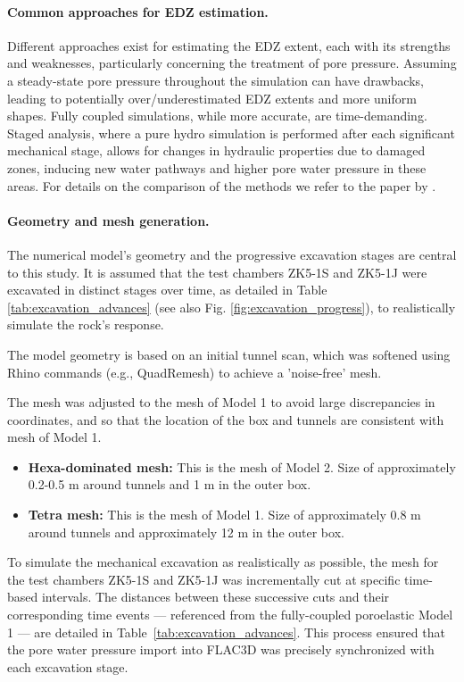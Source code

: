 \paragraph{Common approaches for EDZ estimation.}
Different approaches exist for estimating the \gls{EDZ} extent, each with its strengths and weaknesses, particularly concerning the treatment of pore pressure. Assuming a steady-state pore pressure throughout the simulation can have drawbacks, leading to potentially over/underestimated \gls{EDZ} extents and more uniform shapes. Fully coupled simulations, while more accurate, are time-demanding. Staged analysis, where a pure hydro simulation is performed after each significant mechanical stage, allows for changes in hydraulic properties due to damaged zones, inducing new water pathways and higher pore water pressure in these areas.
For details on the comparison of the methods we refer to the paper by \cite{Marschall2017}.

\paragraph{Geometry and mesh generation.}
The numerical model's geometry and the progressive excavation stages are central to this study.
It is assumed that the test chambers ZK5-1S and ZK5-1J were excavated in distinct stages over time, as detailed in Table \ref{tab:excavation_advances} (see also Fig. \ref{fig:excavation_progress}), to realistically simulate the rock's response.

The model geometry is based on an initial tunnel scan, which was softened using Rhino commands (e.g., QuadRemesh) to achieve a 'noise-free' mesh. 
\par The mesh was adjusted to the mesh of Model 1 to avoid large discrepancies in coordinates, and so that the location of the box and tunnels are consistent with mesh of Model 1.
\begin{itemize}%
    \item \textbf{Hexa-dominated mesh:} This is the mesh of Model 2. Size of approximately 0.2-0.5 m around tunnels and 1 m in the outer box.
    \item \textbf{Tetra mesh:} This is the mesh of Model 1. Size of approximately 0.8 m around tunnels and approximately 12 m in the outer box.
\end{itemize}


To simulate the mechanical excavation as realistically as possible, the mesh for the test chambers ZK5-1S and ZK5-1J was incrementally cut at specific time-based intervals. The distances between these successive cuts and their corresponding time events --- referenced from the fully-coupled poroelastic Model 1 --- are detailed in Table~\ref{tab:excavation_advances}. This process ensured that the pore water pressure import into FLAC3D was precisely synchronized with each excavation stage.

